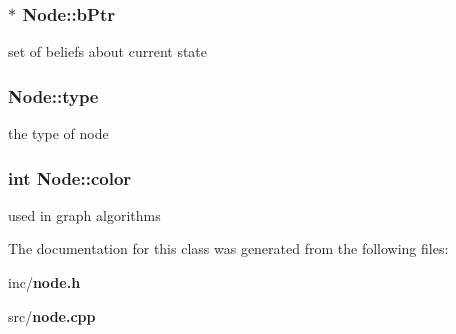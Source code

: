\subsubsection{$\ast$ {\bf Node::bPtr}\hspace{0.3cm}{\tt  [private]}}\label{classNode_fda100bd5a828728ebedff2251861bdf}


set of beliefs about current state 

\subsubsection{ {\bf Node::type}\hspace{0.3cm}{\tt  [private]}}\label{classNode_a791b7bd8347f36b91a1679703a21f91}


the type of node 

\subsubsection{\setlength{\rightskip}{0pt plus 5cm}int {\bf Node::color}\hspace{0.3cm}{\tt  [private]}}\label{classNode_3e6768b832475e9cdaa24be52382115d}


used in graph algorithms 



The documentation for this class was generated from the following files:\begin{CompactItemize}
\item 
inc/{\bf node.h}\item 
src/{\bf node.cpp}\end{CompactItemize}
